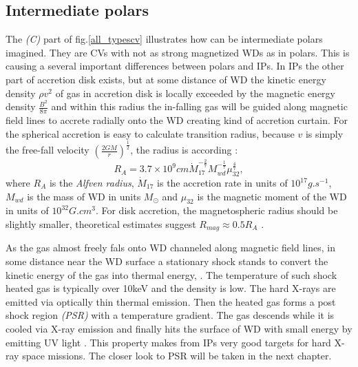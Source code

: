 \documentclass[oneside,a4paper,11pt]{report}
\begin{document}
\subsection{Intermediate polars}
The \textit{(C)} part of fig.\ref{all_typescv} illustrates how can be intermediate polars imagined. 
They are CVs with not as strong magnetized WDs as in polars. This is causing a several important 
differences between polars and IPs. In IPs the other part of accretion disk exists, but at some 
distance of WD the kinetic energy density $\rho v^2$ of gas in accretion disk is locally exceeded by the
 magnetic energy density $\frac{B^2}{8\pi} $ and within this radius the in-falling gas will be guided along magnetic 
field lines to accrete radially onto the WD creating kind of accretion curtain.  
For the spherical accretion is easy to calculate transition radius, because $v$ is simply the 
free-fall velocity $\left( \frac{2GM}{r}\right)^{\frac{1}{2}}$, the radius is according \citet{1994PASP..106..209P}:
\begin{equation}
\label{ipra}
R_A = 3.7 \times 10^9 cm  \dot{M}_{17}^{-\frac{2}{7}}M_{wd}^{-\frac{1}{7}}\mu_{32}^{\frac{4}{7}},
\end{equation}
where $R_A$ is the \textit{Alfven radius}, $\dot{M}_{17}$ is the accretion rate in 
units of $10^{17}g.s^{-1}$, $M_{wd}$ is the mass of WD in units $M_\odot$ and $\mu_{32}$ is the magnetic moment 
of the WD in units of $10^{32} G.cm^3$. For disk accretion, the magnetospheric radius should be slightly 
smaller, theoretical estimates suggest $R_{mag} \approx 0.5R_A$ \citet{1994PASP..106..209P}.  

As the gas almost freely fals onto WD channeled along magnetic field lines, in some distance near the 
WD surface a stationary shock stands to convert the kinetic energy of the gas into thermal energy, 
\citet{2010A&A...520A..25Y}.
The temperature of such shock heated gas is typically over 10keV and the density is low. The hard X-rays 
are emitted via optically thin thermal emission. Then the heated gas forms a post shock region \textit{(PSR)} 
with a temperature gradient. The gas descends while it is cooled via X-ray emission and finally hits 
the surface of WD with small energy by emitting UV light \citet{1973PThPh..49.1184A_aizu}. 
This property makes from IPs very good targets for hard X-ray space missions. The closer look to PSR 
will be taken in the next chapter.   
\end{document}
